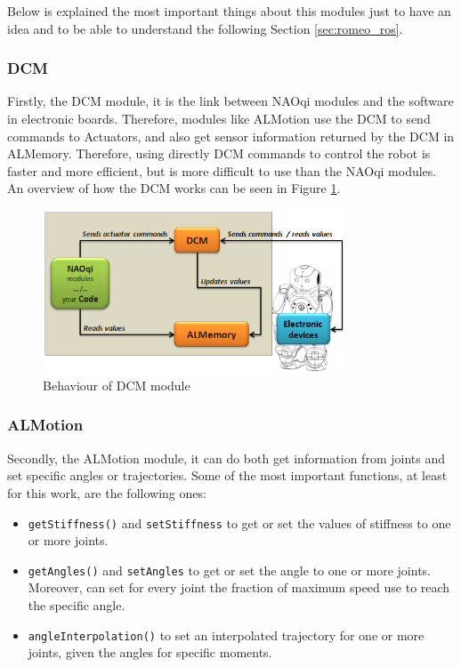 \documentclass[12pt,a4paper,final,twoside,openright]{report}
\begin{document}
Below is explained the most important things about this modules just to have an idea and to be able to understand the following Section \ref{sec:romeo_ros}.

\subsubsection{DCM}

Firstly, the DCM module, it is the link between NAOqi modules and the software in electronic boards. Therefore, modules like ALMotion use the DCM to send commands to Actuators, and also get sensor information returned by the DCM in ALMemory. Therefore, using directly DCM commands to control the robot is faster and more efficient, but is more difficult to use than the NAOqi modules. An overview of how the DCM works can be seen in Figure \ref{fig:naoqi_DCM}.

\begin{figure}[h]
\centering
\includegraphics[width=0.8\textwidth]{images/dcm_overview.png}
\caption{Behaviour of DCM module \cite{Aldebaran}\label{fig:naoqi_DCM}}
\end{figure}

\subsubsection{ALMotion}

Secondly, the ALMotion module, it can do both get information from joints and set specific angles or trajectories. Some of the most important functions, at least for this work, are the following ones:

\begin{itemize}
\item \texttt{getStiffness()} and \texttt{setStiffness} to get or set the values of stiffness to one or more joints.
\item \texttt{getAngles()} and \texttt{setAngles} to get or set the angle to one or more joints. Moreover, can set for every joint the fraction of maximum speed use to reach the specific angle.
\item \texttt{angleInterpolation()} to set an interpolated trajectory for one or more joints, given the angles for specific moments. 
\end{itemize}
\end{document}
